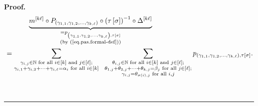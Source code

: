 \documentclass[numbers=enddot,12pt,final,onecolumn,notitlepage]{scrartcl}%
\theoremstyle{definition}
\newenvironment{proof}[1][Proof]{\noindent\textbf{#1.} }{\ \rule{0.5em}{0.5em}}
\let\sumnonlimits\sum
\renewcommand{\sum}{\sumnonlimits\limits}
\begin{document}
\begin{proof}
\begin{align}
&  \ \ \ \ \ \ \ \ \ \ \underbrace{m^{\left[  k\ell\right]  }\circ P_{\left(
\gamma_{1,1},\gamma_{1,2},\ldots,\gamma_{k,\ell}\right)  }\circ\left(
\tau\left[  \sigma\right]  \right)  ^{-1}\circ\Delta^{\left[  k\ell\right]  }%
}_{\substack{=p_{\left(  \gamma_{1,1},\gamma_{1,2},\ldots,\gamma_{k,\ell
}\right)  ,\tau\left[  \sigma\right]  }\\\text{(by (\ref{eq.pas.formal-def}%
))}}}\nonumber\\
&  =\sum_{\substack{\gamma_{i,j}\in\mathbb{N}\text{ for all }i\in\left[
k\right]  \text{ and }j\in\left[  \ell\right]  ;\\\gamma_{i,1}+\gamma
_{i,2}+\cdots+\gamma_{i,\ell}=\alpha_{i}\text{ for all }i\in\left[  k\right]
}}\ \ \sum_{\substack{\theta_{i,j}\in\mathbb{N}\text{ for all }i\in\left[
k\right]  \text{ and }j\in\left[  \ell\right]  ;\\\theta_{1,j}+\theta
_{2,j}+\cdots+\theta_{k,j}=\beta_{j}\text{ for all }j\in\left[  \ell\right]
;\\\gamma_{i,j}=\theta_{\sigma\left(  i\right)  ,j}\text{ for all }%
i,j}}p_{\left(  \gamma_{1,1},\gamma_{1,2},\ldots,\gamma_{k,\ell}\right)
,\tau\left[  \sigma\right]  }. \label{pf.thm.sol-mac-1.7}%
\end{align}



\end{proof}
\end{document}
